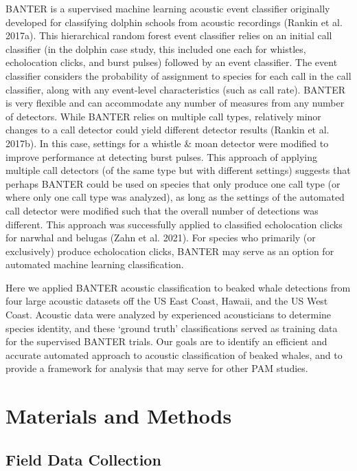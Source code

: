 \documentclass[
  letterpaper,
  DIV=11,
  numbers=noendperiod]{scrartcl}
\begin{document}
BANTER is a supervised machine learning acoustic event classifier
originally developed for classifying dolphin schools from acoustic
recordings (Rankin et al. 2017a). This hierarchical random forest event
classifier relies on an initial call classifier (in the dolphin case
study, this included one each for whistles, echolocation clicks, and
burst pulses) followed by an event classifier. The event classifier
considers the probability of assignment to species for each call in the
call classifier, along with any event-level characteristics (such as
call rate). BANTER is very flexible and can accommodate any number of
measures from any number of detectors. While BANTER relies on multiple
call types, relatively minor changes to a call detector could yield
different detector results (Rankin et al. 2017b). In this case, settings
for a whistle \& moan detector were modified to improve performance at
detecting burst pulses. This approach of applying multiple call
detectors (of the same type but with different settings) suggests that
perhaps BANTER could be used on species that only produce one call type
(or where only one call type was analyzed), as long as the settings of
the automated call detector were modified such that the overall number
of detections was different. This approach was successfully applied to
classified echolocation clicks for narwhal and belugas (Zahn et al.
2021). For species who primarily (or exclusively) produce echolocation
clicks, BANTER may serve as an option for automated machine learning
classification.

Here we applied BANTER acoustic classification to beaked whale
detections from four large acoustic datasets off the US East Coast,
Hawaii, and the US West Coast. Acoustic data were analyzed by
experienced acousticians to determine species identity, and these
`ground truth' classifications served as training data for the
supervised BANTER trials. Our goals are to identify an efficient and
accurate automated approach to acoustic classification of beaked whales,
and to provide a framework for analysis that may serve for other PAM
studies.

\hypertarget{materials-and-methods}{%
\section{Materials and Methods}\label{materials-and-methods}}

\hypertarget{field-data-collection}{%
\subsection{Field Data Collection}\label{field-data-collection}}
\end{document}
